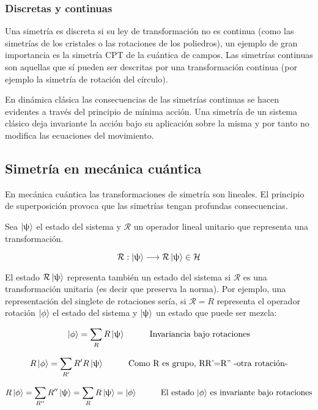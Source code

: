 \documentclass{article}
\begin{document}
\subsubsection{Discretas y continuas}

Una simetría es discreta si su ley de transformación no es continua (como las simetrías de los cristales o las rotaciones de los poliedros), un ejemplo de gran importancia es la simetría CPT de la cuántica de campos. Las simetrías continuas son aquellas que sí pueden ser descritas por una transformación continua (por ejemplo la simetría de rotación del círculo).

\smallskip
En dinámica clásica las consecuencias de las simetrías continuas se hacen evidentes a través del principio de mínima acción. Una simetría de un sistema clásico deja invariante la acción bajo su aplicación sobre la misma y por tanto no modifica las ecuaciones del movimiento.

\subsection{Simetría en mecánica cuántica}

En mecánica cuántica las transformaciones de simetría son lineales. El principio de superposición  provoca que las simetrías tengan profundas consecuencias.

Sea $\ket{\uppsi}$ el estado del sistema y $\mathcal{R}$ un operador lineal unitario que representa una transformación.

$$\mathcal{R}:\ket{\uppsi}\longrightarrow \mathcal{R}\ket{\uppsi}\in \mathcal{H}$$

El estado $\mathcal{R}\ket{\uppsi}$ representa también un estado del sistema si $\mathcal{R}$ es una transformación unitaria (es decir que preserva la norma). Por ejemplo, una representación del singlete de rotaciones sería, si $\mathcal{R}=R$ representa el operador rotación $\ket{\phi}$ el estado del sistema y $\ket{\uppsi}$ un estado que puede ser mezcla:

$$\ket{\phi} = \sum _R R\ket{\uppsi} \hspace{1cm} \text{Invariancia bajo rotaciones}$$

$$R\ket{\phi}=\sum _{R'}R'R\ket{\uppsi} \hspace{1cm} \text{Como R es grupo, RR'=R'' -otra rotación-}$$

$$R\ket{\phi}= \sum _{R''}R''\ket{\uppsi}=\sum _R R\ket{\uppsi}=\ket{\phi} \hspace{1cm} \text{El estado $\ket{\phi}$ es invariante bajo rotaciones}$$
\end{document}
